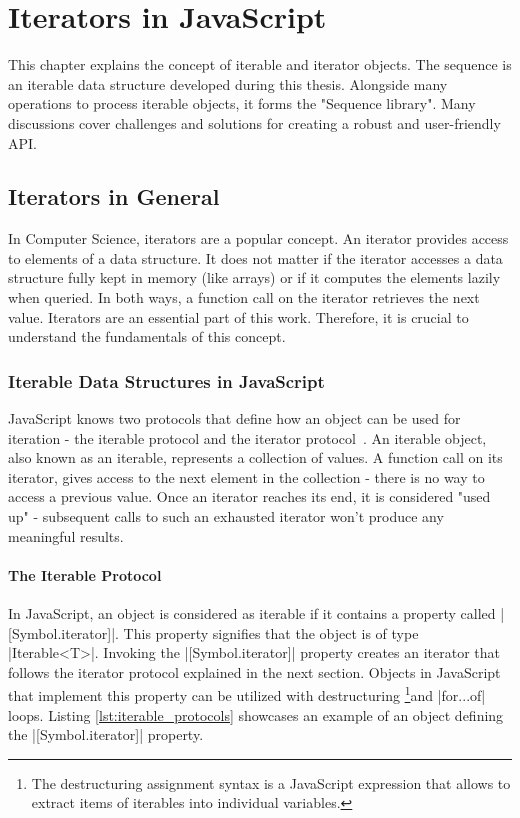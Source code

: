 \chapter{Iterators in JavaScript} %
\label{chap:Iterators in JavaScript}
This chapter explains the concept of iterable and iterator objects. The
sequence is an iterable data structure developed during this thesis. Alongside
many operations to process iterable objects, it forms the "Sequence library".
Many discussions cover challenges and solutions for creating a robust and
user-friendly API.

\section{Iterators in General}
\label{sec:Iterables in General}
In Computer Science, iterators are a popular concept. An iterator provides
access to elements of a data structure. It does not matter if the iterator
accesses a data structure fully kept in memory (like arrays) or if it computes
the elements lazily when queried. In both ways, a function call on the iterator
retrieves the next value. Iterators are an essential part of this work.
Therefore, it is crucial to understand the fundamentals of this concept.

\subsection{Iterable Data Structures in JavaScript}
\label{sub:Iterable data structures in JS}
JavaScript knows two protocols that define how an object can be used for
iteration - the iterable protocol and the iterator
protocol~\cite{mdn_protocols}. An iterable object, also known as an iterable,
represents a collection of values. A function call on its iterator, gives
access to the next element in the collection - there is no way to access a
previous value. Once an iterator reaches its end, it is considered "used up" -
subsequent calls to such an exhausted iterator won't produce any meaningful
results.

\subsubsection{The Iterable Protocol}
\label{subsub:The Iterable Protocol}
In JavaScript, an object is considered as iterable if it contains a property
called |[Symbol.iterator]|. This property signifies that the object is of type
|Iterable<T>|. Invoking the |[Symbol.iterator]| property creates an
iterator that follows the iterator protocol explained in the next section.
Objects in JavaScript that implement this property can be utilized with
destructuring \footnote{The destructuring assignment syntax is a JavaScript
expression that allows to extract items of iterables into individual
variables.}and |for...of| loops. Listing \ref{lst:iterable_protocols}
showcases an example of an object defining the |[Symbol.iterator]| property.

